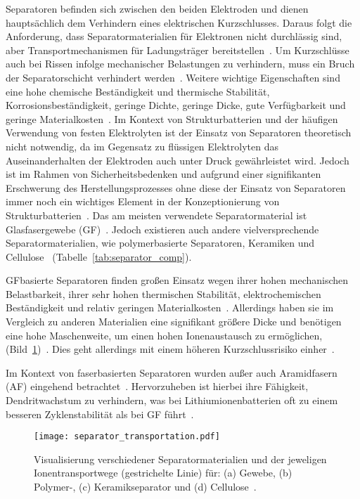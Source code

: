Separatoren befinden sich zwischen den beiden Elektroden und dienen hauptsächlich dem Verhindern eines elektrischen Kurzschlusses. Daraus folgt die Anforderung, dass Separatormaterialien für Elektronen nicht durchlässig sind, aber Transportmechanismen für Ladungsträger bereitstellen~\cite{Kurzweil2015}. Um Kurzschlüsse auch bei Rissen infolge mechanischer Belastungen zu verhindern, muss ein Bruch der Separatorschicht verhindert werden~\cite{Asp2015}. Weitere wichtige Eigenschaften sind eine hohe chemische Beständigkeit und thermische Stabilität, Korrosionsbeständigkeit, geringe Dichte, geringe Dicke, gute Verfügbarkeit und geringe Materialkosten~\cite{Beard2019}. Im Kontext von Strukturbatterien und der häufigen Verwendung von festen Elektrolyten ist der Einsatz von Separatoren theoretisch nicht notwendig, da im Gegensatz zu flüssigen Elektrolyten das Auseinanderhalten der Elektroden auch unter Druck gewährleistet wird. Jedoch ist im Rahmen von Sicherheitsbedenken und aufgrund einer signifikanten Erschwerung des Herstellungsprozesses ohne diese der Einsatz von Separatoren immer noch ein wichtiges Element in der Konzeptionierung von Strukturbatterien~\cite{Asp2015, Hubert2022}. Das am meisten verwendete Separatormaterial ist Glasfasergewebe (GF)~\cite{Zhou2022}. Jedoch existieren auch andere vielversprechende Separatormaterialien, wie polymerbasierte Separatoren, Keramiken und Cellulose~\cite{Simon2008, Greenhalgh2023, Chaudhary2024a} (Tabelle~\ref{tab:separator_comp}).



GFbasierte Separatoren finden großen Einsatz wegen ihrer hohen mechanischen Belastbarkeit, ihrer sehr hohen thermischen Stabilität, elektrochemischen Beständigkeit und relativ geringen Materialkosten~\cite{Luo2015,Asp2019,Asp2021,Liu2022}. Allerdings haben sie im Vergleich zu anderen Materialien eine signifikant größere Dicke und benötigen eine hohe Maschenweite, um einen hohen Ionenaustausch zu ermöglichen, (Bild~\ref{fig:separator_transportation})~\cite{Danzi2021}. Dies geht allerdings mit einem höheren Kurzschlussrisiko einher~\cite{Zhou2022}.

Im Kontext von faserbasierten Separatoren wurden außer auch Aramidfasern (AF) eingehend betrachtet~\cite{Jin2023}. Hervorzuheben ist hierbei ihre Fähigkeit, Dendritwachstum zu verhindern, was bei Lithiumionenbatterien oft zu einem besseren Zyklenstabilität als bei GF führt~\cite{Tung2015,Wang2021a}.

\begin{figure}[ht]
        \center
	\texttt{[image: separator\_transportation.pdf]}
		\caption{\label{fig:separator_transportation}Visualisierung verschiedener Separatormaterialien und der jeweligen Ionentransportwege (gestrichelte Linie) für: (a) Gewebe, (b) Polymer-, (c) Keramikseparator und (d) Cellulose~\cite{Zschiebsch2024}.}
\end{figure}


